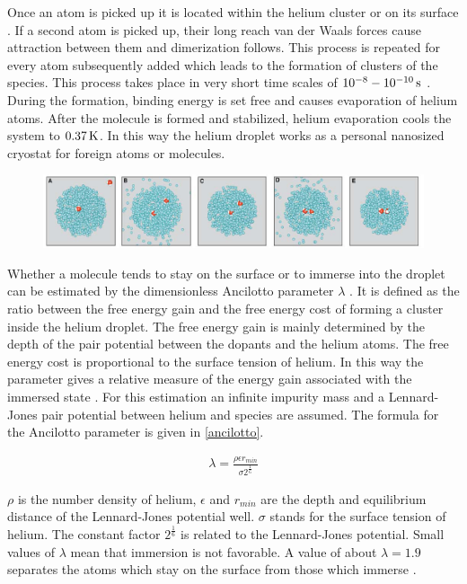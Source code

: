 \documentclass[parskip,12pt,headsepline,a4paper] {scrbook}
\begin{document}
Once an atom is picked up it is located within the helium cluster or on its surface \cite{pickup-desc}. If a second atom is picked up, their long reach van der Waals forces cause attraction between them and dimerization follows. This process is repeated for every atom subsequently added which leads to the formation of clusters of the species. This process takes place in very short time scales of $\unit[10^{-8} - 10^{-10}]{s}$ \cite{toennis}. During the formation, binding energy is set free and causes evaporation of helium atoms. After the molecule is formed and stabilized, helium evaporation cools the system to $\unit[0.37]{K}$. In this way the helium droplet works as a personal nanosized cryostat for foreign atoms or molecules. \cite{evap-cryo}

\begin{figure}[ht]
\centerline{
\includegraphics[width=13cm]{./doping/doping-helium.jpg}}
\end{figure}

Whether a molecule tends to stay on the surface or to immerse into the droplet can be estimated by the dimensionless Ancilotto parameter $\lambda$ \cite{ancil-param}. It is defined as the ratio between the free energy gain and the free energy cost of forming a cluster inside the helium droplet. The free energy gain is mainly determined by the depth of the pair potential between the dopants and the helium atoms. The free energy cost is proportional to the surface tension of helium. In this way the parameter gives a relative measure of the energy gain associated with the immersed state \cite{ancil-param}. For this estimation an infinite impurity mass and a Lennard-Jones pair potential between helium and species are assumed. The formula for the Ancilotto parameter is given in \ref{ancilotto}.

\begin{align}  \label{ancilotto}
\lambda = \frac{\rho \epsilon r_{min}}{\sigma 2^{\frac{1}{6}}}
\end{align}

$\rho$ is the number density of helium, $\epsilon$ and $r_{min}$ are the depth and equilibrium distance of the Lennard-Jones potential well. $\sigma$ stands for the surface tension of helium. The constant factor $2^{\frac{1}{6}}$ is related to the Lennard-Jones potential.
Small values of $\lambda$ mean that immersion is not favorable. A value of about $\lambda = 1.9$ separates the atoms which stay on the surface from those which immerse \cite{acil-param-value}.
\end{document}
